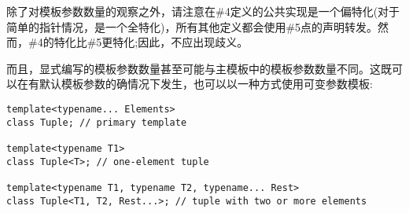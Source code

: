 除了对模板参数数量的观察之外，请注意在\#4定义的公共实现是一个偏特化(对于简单的指针情况，是一个全特化)，所有其他定义都会使用\#5点的声明转发。然而，\#4的特化比\#5更特化;因此，不应出现歧义。

而且，显式编写的模板参数数量甚至可能与主模板中的模板参数数量不同。这既可以在有默认模板参数的确情况下发生，也可以以一种方式使用可变参数模板:

\begin{lstlisting}[style=styleCXX]
template<typename... Elements>
class Tuple; // primary template

template<typename T1>
class Tuple<T>; // one-element tuple

template<typename T1, typename T2, typename... Rest>
class Tuple<T1, T2, Rest...>; // tuple with two or more elements
\end{lstlisting}


















